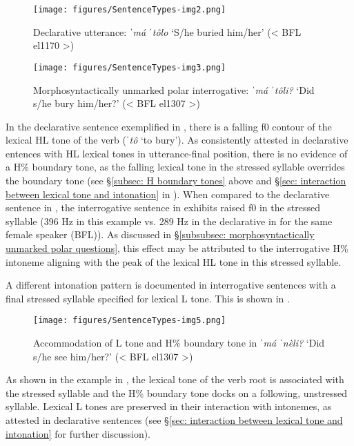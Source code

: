 \begin{figure}
\texttt{[image: figures/SentenceTypes-img2.png]}
\caption{
\label{fig: declarative intonation 2}
Declarative utterance: \textit{ˈmá ˈtôlo} `S/he buried him/her' (< BFL el1170 >)}
\end{figure}

\begin{figure}
\texttt{[image: figures/SentenceTypes-img3.png]}
\caption{
\label{fig: morphosyntactically unmarked polar intonation 2}
Morphosyntactically unmarked polar interrogative: \textit{ˈmá ˈtôli?} `Did s/he bury him/her?' (< BFL el1307 >)}
\end{figure}

In the declarative sentence exemplified in , there is a falling f0 contour of the lexical HL tone of the verb (\textit{ˈtô} `to bury'). As consistently attested in declarative entences with HL lexical tones in utterance-final position, there is no evidence of a H\% boundary tone, as the falling lexical tone in the stressed syllable overrides the boundary tone (see §\ref{subsec: H boundary tones} above and §\ref{sec: interaction between lexical tone and intonation} in ). When compared to the declarative sentence in , the interrogative sentence in   exhibits raised f0 in the stressed syllable (396 Hz in this example vs. 289 Hz in the declarative in  for the same female speaker (BFL)). As discussed in §\ref{subsubsec: morphosyntactically unmarked polar questions}, this effect may be attributed to the interrogative H\% intoneme aligning with the peak of the lexical HL tone in this stressed syllable.

A different intonation pattern is documented in interrogative sentences with a final stressed syllable specified for lexical L tone. This is shown in .


\begin{figure}
\texttt{[image: figures/SentenceTypes-img5.png]}
\caption{
\label{fig: L tone plus H boundary tone 2}
Accommodation of L tone and H\% boundary tone in \textit{ˈmá ˈnèli?} `Did s/he see him/her?' (< BFL el1307 >)}
\end{figure}

As shown in the example in , the lexical tone of the verb root is associated with the stressed syllable and the H\% boundary tone docks on a following, unstressed syllable. Lexical L tones are preserved in their interaction with intonemes, as attested in declarative sentences (see §\ref{sec: interaction between lexical tone and intonation} for further discussion).

